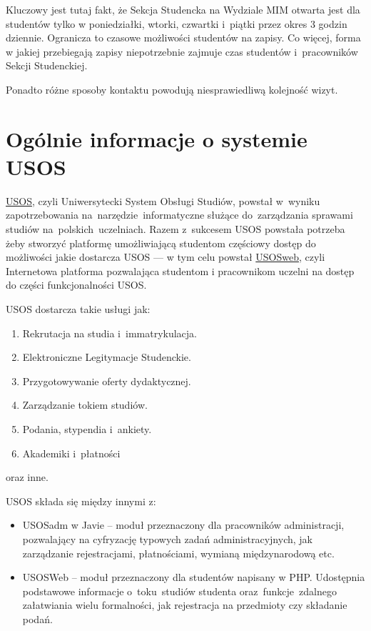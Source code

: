 \documentclass[licencjacka]{pracamgr}
\begin{document}
Kluczowy jest tutaj fakt, że Sekcja Studencka na Wydziale MIM otwarta jest dla studentów tylko w poniedziałki, wtorki, czwartki i~piątki przez okres 3 godzin dziennie. Ogranicza to czasowe możliwości studentów na zapisy. Co więcej, forma w jakiej przebiegają zapisy niepotrzebnie zajmuje czas studentów i~pracowników Sekcji Studenckiej.

Ponadto różne sposoby kontaktu powodują niesprawiedliwą kolejność wizyt.


\section{Ogólnie informacje o systemie USOS}
\href{http://usos.edu.pl}{USOS}, czyli Uniwersytecki System Obsługi Studiów, powstał w~wyniku zapotrzebowania na~narzędzie~informatyczne służące do~zarządzania sprawami studiów na~polskich~uczelniach. Razem z~sukcesem USOS powstała potrzeba żeby stworzyć platformę umożliwiającą studentom częściowy dostęp do możliwości jakie dostarcza USOS --- w tym celu powstał \href{htpp://usosweb.uw.edu.pl}{USOSweb}, czyli Internetowa platforma pozwalająca studentom i pracownikom uczelni na dostęp do części funkcjonalności USOS.

USOS dostarcza takie usługi jak:
\begin{enumerate}
\item Rekrutacja na studia i~immatrykulacja.
\item Elektroniczne Legitymacje Studenckie.
\item Przygotowywanie oferty dydaktycznej. 
\item Zarządzanie tokiem studiów.
\item Podania, stypendia i~ankiety.
\item Akademiki i~płatności
\end{enumerate}
oraz inne.

USOS składa się między innymi z:
\begin{itemize}
\item USOSadm w Javie -- moduł przeznaczony dla pracowników administracji, pozwalający na cyfryzację typowych zadań administracyjnych, jak zarządzanie rejestracjami, płatnościami, wymianą międzynarodową etc.
\item USOSWeb -- moduł przeznaczony dla studentów napisany w PHP. Udostępnia podstawowe informacje o~toku~studiów studenta oraz~funkcje~zdalnego załatwiania wielu formalności, jak rejestracja na przedmioty czy składanie podań.
\end{itemize}
\end{document}
